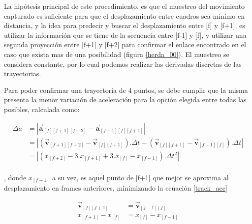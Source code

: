 La hipótesis principal de este procedimiento, es que el muestreo del movimiento capturado  es suficiente para que el desplazamiento entre cuadros sea mínimo en distancia, y la idea para predecir y buscar el desplazamiento entre [f] y [f+1], es utilizar la información que se tiene de la secuencia entre [f-1] y [f], y utilizar una segunda proyección entre [f+1] y [f+2] para confirmar el enlace encontrado en el caso que exista mas de una posibilidad (figura \ref{herda_00}). El muestreo se considera constante, por lo cual podemos realizar las derivadas discretas de las trayectorias.

Para poder confirmar una trayectoria de 4 puntos, se debe cumplir que la misma presenta la menor variación de aceleración para la opción elegida entre todas las posibles, calculada como:

\begin{equation}
\begin{split}
\Delta{a}&= \left| \boldsymbol{\overrightarrow{a}}_{[f][f+1][f+2]}-\boldsymbol{\overrightarrow{a}}_{[f-1][f][f+1]} \right| \\
&= \left| \left(\boldsymbol{\overrightarrow{v}}_{[f+1][f+2]}-\boldsymbol{\overrightarrow{v}}_{[f][f+1]}\right).\Delta{t}-\left(\boldsymbol{\overrightarrow{v}}_{[f][f+1]}-\boldsymbol{\overrightarrow{v}}_{[f-1][f]}\right).\Delta{t} \right| \\
&= \left|\left( x_{[f+2]} - 3.x_{[f+1]} + 3.x_{[f]} - x_{[f-1]} \right).\Delta{t}^2\right|\\
\end{split}
\label{track_var_acc}
\end{equation}

, donde $x_{[f+1]}$ a su vez, es aquel punto de [f+1] que mejor se aproxima al desplazamiento en frames anteriores, minimizando la ecuación \ref{track_acc} 

\begin{equation}
\begin{split}
\boldsymbol{\overrightarrow{v}}_{[f][f+1]}& = \boldsymbol{\overrightarrow{v}}_{[f-1][f]} \\
x_{[f+1]}-x_{[f]}& = x_{[f]}-x_{[f-1]} \\
\end{split}
\label{track_acc}
\end{equation}

